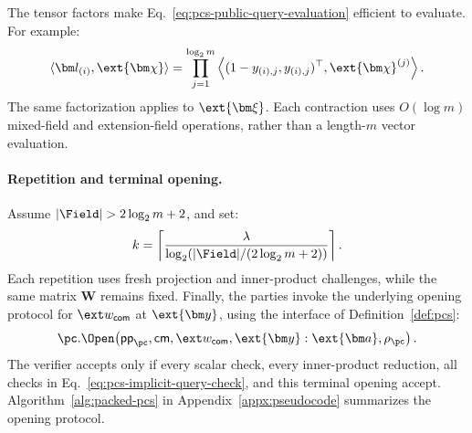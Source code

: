 The tensor factors make Eq.~\eqref{eq:pcs-public-query-evaluation}
efficient to evaluate. For example:
\[
    \langle\bm l_{(i)},\ext{\bm\chi}\rangle
    =
    \prod_{j=1}^{\log_2m}
    \left\langle
        (1-y_{(i),j},y_{(i),j})^\top,
        \ext{\bm\chi}^{(j)}
    \right\rangle.
\]
The same factorization applies to \(\ext{\bm\xi}\).
Each contraction uses \(O(\log m)\) mixed-field and extension-field
operations, rather than a length-\(m\) vector evaluation.

\paragraph{Repetition and terminal opening.}
Assume \(|\Field|>2\log_2m+2\), and set:
\begin{equation}
    k=
    \left\lceil
        \frac{\lambda}{
            \log_2\!\left(
                |\Field|/(2\log_2m+2)
            \right)
        }
    \right\rceil.
\label{eq:pcs-repetition-number}
\end{equation}
Each repetition uses fresh projection and inner-product challenges,
while the same matrix \(\bm W\) remains fixed.
Finally, the parties invoke the underlying opening protocol for
\(\ext w_{\mathsf{com}}\) at \(\ext{\bm y}\), using the interface
of Definition~\ref{def:pcs}:
\[
    \pc.\Open\!\left(
        \mathsf{pp}_{\pc},\mathsf{cm},
        \ext w_{\mathsf{com}},\ext{\bm y}
        :\ext{\bm a},\rho_{\pc}
    \right).
\]
The verifier accepts only if every scalar check, every inner-product
reduction, all checks in Eq.~\eqref{eq:pcs-implicit-query-check},
and this terminal opening accept.
Algorithm~\ref{alg:packed-pcs} in Appendix~\ref{appx:pseudocode}
summarizes the opening protocol.

\medskip{}

